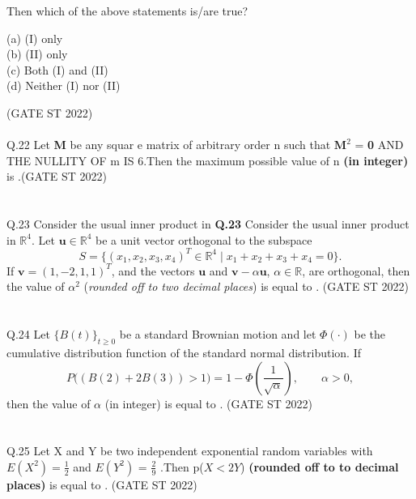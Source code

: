 \documentclass[journal,12pt,onecolumn]{IEEEtran}
\theoremstyle{remark}
\begin{document}
Then which of the above statements is/are true?\\
\begin{multicols}{4}
(a) (I) only \\
(b) (II) only \\
(c) Both (I) and (II)\\
(d) Neither (I) nor (II)
\end{multicols}
 \hfill (GATE ST 2022)\\
 \\
Q.22 Let \textbf{M} be any squar e matrix of arbitrary order n such that $\textbf{M}^2$  = \textbf{0} AND THE NULLITY OF m IS 6.Then the maximum possible value of n \textbf{(in integer)} is \underline{\hspace{2cm}}.\hfill (GATE ST 2022)\\
\\
\\
	\vspace{2em}
Q.23 Consider the usual inner product in \textbf{Q.23} Consider the usual inner product in $\mathbb{R}^4$. 
Let $\mathbf{u} \in \mathbb{R}^4$ be a unit vector orthogonal to the subspace
\[
S = \{ (x_1, x_2, x_3, x_4)^T \in \mathbb{R}^4 
\mid x_1 + x_2 + x_3 + x_4 = 0 \}.
\]
If $\mathbf{v} = (1, -2, 1, 1)^T$, and the vectors $\mathbf{u}$ and 
$\mathbf{v} - \alpha \mathbf{u}$, $\alpha \in \mathbb{R}$, are orthogonal, 
then the value of $\alpha^2$ (\textit{rounded off to two decimal places}) is equal to 
\underline{\hspace{2cm}}. \hfill (GATE ST 2022)\\
\\
\\
Q.24 Let $\{ B(t) \}_{t \geq 0}$ be a standard Brownian motion and let 
$\Phi(\cdot)$ be the cumulative distribution function of the standard normal distribution. 
If 
\[
P\big( (B(2) + 2B(3)) > 1 \big)
= 1 - \Phi\left( \frac{1}{\sqrt{\alpha}} \right), 
\qquad \alpha > 0,
\]
then the value of $\alpha$ (in integer) is equal to 
\underline{\hspace{2cm}}. \hfill (GATE ST 2022)\\
\\
\\
Q.25 Let X and Y be two independent exponential random variables with $E(X^2) = \frac{1}{2} $ and $E(Y^2)$ = $\frac{2}{9}$ .Then p($ X < 2Y$) \textbf{(rounded off to to decimal places)} is equal to \underline{\hspace{2cm}}. \hfill (GATE ST 2022)\\
\\
\end{document}
